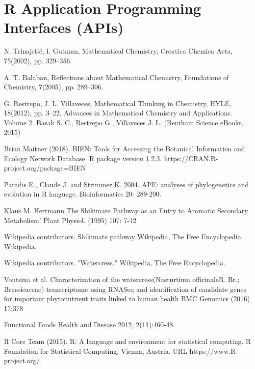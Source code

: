 \section{R Application Programming Interfaces (APIs)}





\begin{thebibliography}{00}

N. Trinajstić, I. Gutman, 
\newblock Mathematical Chemistry, 
\newblock Croatica Chemica Acta, 75(2002), pp. 329–356.

A. T. Balaban, 
\newblock Reflections about Mathematical Chemistry, 
\newblock Foundations of Chemistry, 7(2005), pp. 289–306.

G. Restrepo, J. L. Villaveces, 
\newblock Mathematical Thinking in Chemistry, HYLE, 18(2012), pp. 3–22.
\newblock Advances in Mathematical Chemistry and Applications. Volume 2. Basak S. C., Restrepo G., Villaveces J. L. (Bentham Science eBooks, 2015)

Brian Maitner (2018). 
\newblock BIEN: Tools for Accessing the Botanical Information and Ecology
\newblock Network Database. R package version 1.2.3. https://CRAN.R-project.org/package=BIEN

 Paradis E., Claude J. and Strimmer K. 2004. 
\newblock APE: analyses of phylogenetics and evolution in R language. 
\newblock Bioinformatics 20: 289-290.

 Klaus M. Herrmann 
\newblock The Shikimate Pathway as an  Entry to Aromatic Secondary Metabolism' 
\newblock Plant Physiol. (1995) 107: 7-12

 Wikipedia contributors. 
\newblock Shikimate pathway 
\newblock Wikipedia, The Free Encyclopedia. Wikipedia. 

Wikipedia contributors. 
\newblock "Watercress." 
\newblock Wikipedia, The Free Encyclopedia. 

 Voutsina et al.
\newblock Characterization of the watercress(Nasturtium officinaleR. Br.; Brassicaceae) transcriptome using RNASeq and
identification of candidate genes for important phytonutrient traits linked to human health
\newblock BMC Genomics (2016) 17:378 

\newblock Functional Foods 
\newblock Health and Disease 2012, 2(11):460-48

R Core Team (2015). 
\newblock R: A language and environment for statistical computing. R Foundation for Statistical Computing, Vienna, Austria.
\newblock URL https://www.R-project.org/.

\end{thebibliography}

